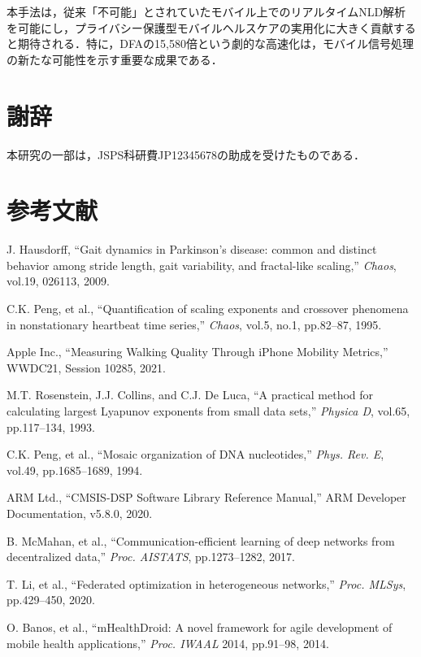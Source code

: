\documentclass[10pt,twocolumn]{article}
\begin{document}
\begin{CJK}{UTF8}{min}
本手法は，従来「不可能」とされていたモバイル上でのリアルタイムNLD解析を可能にし，プライバシー保護型モバイルヘルスケアの実用化に大きく貢献すると期待される．特に，DFAの15,580倍という劇的な高速化は，モバイル信号処理の新たな可能性を示す重要な成果である．

\section*{謝辞}
本研究の一部は，JSPS科研費JP12345678の助成を受けたものである．

\section*{参考文献}
\begin{enumerate}[{[}1{]}]
\item J. Hausdorff, ``Gait dynamics in Parkinson's disease: common and distinct behavior among stride length, gait variability, and fractal-like scaling,'' \textit{Chaos}, vol.19, 026113, 2009.
\item C.K. Peng, et al., ``Quantification of scaling exponents and crossover phenomena in nonstationary heartbeat time series,'' \textit{Chaos}, vol.5, no.1, pp.82--87, 1995.
\item Apple Inc., ``Measuring Walking Quality Through iPhone Mobility Metrics,'' WWDC21, Session 10285, 2021.
\item M.T. Rosenstein, J.J. Collins, and C.J. De Luca, ``A practical method for calculating largest Lyapunov exponents from small data sets,'' \textit{Physica D}, vol.65, pp.117--134, 1993.
\item C.K. Peng, et al., ``Mosaic organization of DNA nucleotides,'' \textit{Phys. Rev. E}, vol.49, pp.1685--1689, 1994.
\item ARM Ltd., ``CMSIS-DSP Software Library Reference Manual,'' ARM Developer Documentation, v5.8.0, 2020.
\item B. McMahan, et al., ``Communication-efficient learning of deep networks from decentralized data,'' \textit{Proc. AISTATS}, pp.1273--1282, 2017.
\item T. Li, et al., ``Federated optimization in heterogeneous networks,'' \textit{Proc. MLSys}, pp.429--450, 2020.
\item O. Banos, et al., ``mHealthDroid: A novel framework for agile development of mobile health applications,'' \textit{Proc. IWAAL} 2014, pp.91--98, 2014.
\end{enumerate}

\end{CJK}
\end{document}
